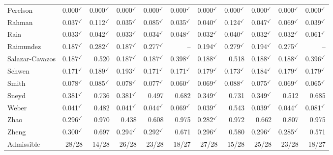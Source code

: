 \begin{longtable}{@{}lrrrrr|rrrrr@{}}
Perelson & 0.000$^{\checkmark}$ & 0.000$^{\checkmark}$ & 0.000$^{\checkmark}$ & 0.000$^{\checkmark}$ & 0.000$^{\checkmark}$ & 0.000$^{\checkmark}$ & 0.000$^{\checkmark}$ & 0.000$^{\checkmark}$ & 0.000$^{\checkmark}$ & 0.000$^{\checkmark}$ \\
Rahman & 0.037$^{\checkmark}$ & 0.112$^{\checkmark}$ & 0.035$^{\checkmark}$ & 0.085$^{\checkmark}$ & 0.035$^{\checkmark}$ & 0.040$^{\checkmark}$ & 0.124$^{\checkmark}$ & 0.047$^{\checkmark}$ & 0.069$^{\checkmark}$ & 0.039$^{\checkmark}$ \\
Raia & 0.033$^{\checkmark}$ & 0.042$^{\checkmark}$ & 0.033$^{\checkmark}$ & 0.034$^{\checkmark}$ & 0.048$^{\checkmark}$ & 0.032$^{\checkmark}$ & 0.040$^{\checkmark}$ & 0.032$^{\checkmark}$ & 0.032$^{\checkmark}$ & 0.061$^{\checkmark}$ \\
Raimundez & 0.187$^{\checkmark}$ & 0.282$^{\checkmark}$ & 0.187$^{\checkmark}$ & 0.277$^{\checkmark}$ & -- & 0.194$^{\checkmark}$ & 0.279$^{\checkmark}$ & 0.194$^{\checkmark}$ & 0.275$^{\checkmark}$ & -- \\
Salazar-Cavazos & 0.187$^{\checkmark}$ & 0.520 & 0.187$^{\checkmark}$ & 0.187$^{\checkmark}$ & 0.398$^{\checkmark}$ & 0.188$^{\checkmark}$ & 0.518 & 0.188$^{\checkmark}$ & 0.188$^{\checkmark}$ & 0.396$^{\checkmark}$ \\
Schwen & 0.171$^{\checkmark}$ & 0.189$^{\checkmark}$ & 0.193$^{\checkmark}$ & 0.171$^{\checkmark}$ & 0.171$^{\checkmark}$ & 0.179$^{\checkmark}$ & 0.173$^{\checkmark}$ & 0.184$^{\checkmark}$ & 0.179$^{\checkmark}$ & 0.179$^{\checkmark}$ \\
Smith & 0.078$^{\checkmark}$ & 0.085$^{\checkmark}$ & 0.078$^{\checkmark}$ & 0.077$^{\checkmark}$ & 0.060$^{\checkmark}$ & 0.069$^{\checkmark}$ & 0.088$^{\checkmark}$ & 0.075$^{\checkmark}$ & 0.069$^{\checkmark}$ & 0.065$^{\checkmark}$ \\
Sneyd & 0.381$^{\checkmark}$ & 0.736 & 0.381$^{\checkmark}$ & 0.497 & 0.682 & 0.349$^{\checkmark}$ & 0.731 & 0.349$^{\checkmark}$ & 0.512 & 0.685 \\
Weber & 0.041$^{\checkmark}$ & 0.482 & 0.041$^{\checkmark}$ & 0.044$^{\checkmark}$ & 0.069$^{\checkmark}$ & 0.039$^{\checkmark}$ & 0.543 & 0.039$^{\checkmark}$ & 0.044$^{\checkmark}$ & 0.081$^{\checkmark}$ \\
Zhao & 0.296$^{\checkmark}$ & 0.970 & 0.438 & 0.608 & 0.975 & 0.282$^{\checkmark}$ & 0.972 & 0.662 & 0.807 & 0.975 \\
Zheng & 0.300$^{\checkmark}$ & 0.697 & 0.294$^{\checkmark}$ & 0.292$^{\checkmark}$ & 0.671 & 0.296$^{\checkmark}$ & 0.580 & 0.296$^{\checkmark}$ & 0.285$^{\checkmark}$ & 0.571 \\
\midrule Admissible & 28/28 & 14/28 & 26/28 & 23/28 & 18/27 & 27/28 & 15/28 & 25/28 & 23/28 & 18/27 \\
\bottomrule
\end{longtable}
